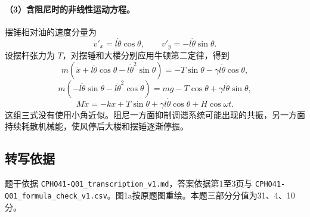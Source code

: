 \paragraph{（3）含阻尼时的非线性运动方程。}
摆锤相对油的速度分量为
\[
v'_x=l\dot\theta\cos\theta,
\qquad v'_y=-l\dot\theta\sin\theta.
\]
设摆杆张力为 $T$，对摆锤和大楼分别应用牛顿第二定律，得到
\[
m\left(\ddot x+l\ddot\theta\cos\theta-l\dot\theta^2\sin\theta\right)
=-T\sin\theta-\gamma l\dot\theta\cos\theta,
\]
\[
m\left(-l\ddot\theta\sin\theta-l\dot\theta^2\cos\theta\right)
=mg-T\cos\theta+\gamma l\dot\theta\sin\theta,
\]
\[
M\ddot x=-kx+T\sin\theta+\gamma l\dot\theta\cos\theta+H\cos\omega t.
\]
这组三式没有使用小角近似。阻尼一方面抑制调谐系统可能出现的共振，另一方面持续耗散机械能，使风停后大楼和摆锤逐渐停振。
\subsection{转写依据}
题干依据 \texttt{CPHO41-Q01\_transcription\_v1.md}，答案依据第1至3页与 \texttt{CPHO41-Q01\_formula\_check\_v1.csv}。图1a按原题图重绘。本题三部分分值为31、4、10分。
